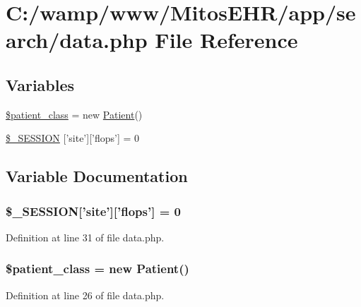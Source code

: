 \hypertarget{search_2data_8php}{\section{\-C\-:/wamp/www/\-Mitos\-E\-H\-R/app/search/data.php \-File \-Reference}
\label{search_2data_8php}
}
\subsection*{\-Variables}
\begin{DoxyCompactItemize}
\item 
\hyperlink{search_2data_8php_a140436070274b6f75c7b4c252e84cb3d}{\$patient\-\_\-class} = new \hyperlink{class_patient}{\-Patient}()
\item 
\hyperlink{search_2data_8php_a99fda8552a3e58235643b79f5af3ded8}{\$\-\_\-\-S\-E\-S\-S\-I\-O\-N} \mbox{[}'site'\mbox{]}\mbox{[}'flops'\mbox{]} = 0
\end{DoxyCompactItemize}


\subsection{\-Variable \-Documentation}
\hypertarget{search_2data_8php_a99fda8552a3e58235643b79f5af3ded8}{
\subsubsection[{\$\-\_\-\-S\-E\-S\-S\-I\-O\-N}]{\setlength{\rightskip}{0pt plus 5cm}\$\-\_\-\-S\-E\-S\-S\-I\-O\-N\mbox{[}'site'\mbox{]}\mbox{[}'flops'\mbox{]} = 0}}\label{search_2data_8php_a99fda8552a3e58235643b79f5af3ded8}


\-Definition at line 31 of file data.\-php.

\hypertarget{search_2data_8php_a140436070274b6f75c7b4c252e84cb3d}{
\subsubsection[{\$patient\-\_\-class}]{\setlength{\rightskip}{0pt plus 5cm}\$patient\-\_\-class = new {\bf \-Patient}()}}\label{search_2data_8php_a140436070274b6f75c7b4c252e84cb3d}


\-Definition at line 26 of file data.\-php.

